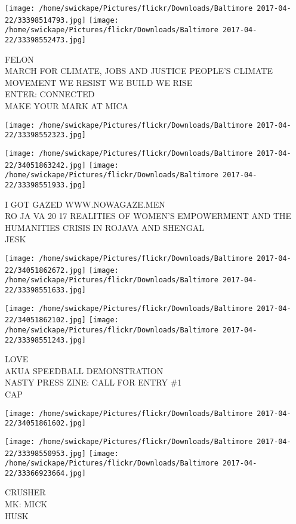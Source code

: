 \documentclass[10pt,letterpaper]{article}
\begin{document}
\texttt{[image: /home/swickape/Pictures/flickr/Downloads/Baltimore 2017-04-22/33398514793.jpg]}
\texttt{[image: /home/swickape/Pictures/flickr/Downloads/Baltimore 2017-04-22/33398552473.jpg]}

FELON\\
MARCH FOR CLIMATE, JOBS AND JUSTICE PEOPLE'S CLIMATE MOVEMENT WE RESIST WE BUILD WE RISE\\
ENTER: CONNECTED\\
MAKE YOUR MARK AT MICA
\pagebreak

\texttt{[image: /home/swickape/Pictures/flickr/Downloads/Baltimore 2017-04-22/33398552323.jpg]}

\vspace{0.25in}
\texttt{[image: /home/swickape/Pictures/flickr/Downloads/Baltimore 2017-04-22/34051863242.jpg]}
\texttt{[image: /home/swickape/Pictures/flickr/Downloads/Baltimore 2017-04-22/33398551933.jpg]}

I GOT GAZED WWW.NOWAGAZE.MEN\\
RO JA VA 20 17 REALITIES OF WOMEN'S EMPOWERMENT AND THE HUMANITIES CRISIS IN ROJAVA AND SHENGAL\\
JESK
\pagebreak

\texttt{[image: /home/swickape/Pictures/flickr/Downloads/Baltimore 2017-04-22/34051862672.jpg]}
\texttt{[image: /home/swickape/Pictures/flickr/Downloads/Baltimore 2017-04-22/33398551633.jpg]}

\texttt{[image: /home/swickape/Pictures/flickr/Downloads/Baltimore 2017-04-22/34051862102.jpg]}
\texttt{[image: /home/swickape/Pictures/flickr/Downloads/Baltimore 2017-04-22/33398551243.jpg]}

LOVE\\
AKUA SPEEDBALL DEMONSTRATION\\
NASTY PRESS ZINE: CALL FOR ENTRY \#1\\
CAP
\pagebreak

\texttt{[image: /home/swickape/Pictures/flickr/Downloads/Baltimore 2017-04-22/34051861602.jpg]}

\vspace{0.25in}
\texttt{[image: /home/swickape/Pictures/flickr/Downloads/Baltimore 2017-04-22/33398550953.jpg]}
\texttt{[image: /home/swickape/Pictures/flickr/Downloads/Baltimore 2017-04-22/33366923664.jpg]}

CRUSHER\\
MK: MICK\\
HUSK
\pagebreak
\end{document}
